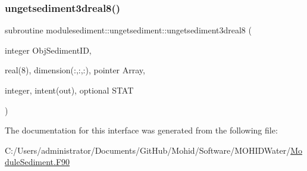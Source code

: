 \subsubsection{\texorpdfstring{ungetsediment3dreal8()}{ungetsediment3dreal8()}}
{\footnotesize\ttfamily subroutine modulesediment\+::ungetsediment\+::ungetsediment3dreal8 (\begin{DoxyParamCaption}\item[{integer}]{Obj\+Sediment\+ID,  }\item[{real(8), dimension(\+:,\+:,\+:), pointer}]{Array,  }\item[{integer, intent(out), optional}]{S\+T\+AT }\end{DoxyParamCaption})\hspace{0.3cm}{\ttfamily [private]}}



The documentation for this interface was generated from the following file\+:\begin{DoxyCompactItemize}
\item 
C\+:/\+Users/administrator/\+Documents/\+Git\+Hub/\+Mohid/\+Software/\+M\+O\+H\+I\+D\+Water/\mbox{\hyperlink{_module_sediment_8_f90}{Module\+Sediment.\+F90}}\end{DoxyCompactItemize}
